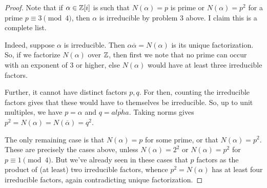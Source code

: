 \begin{proof}
    Note that if $\alpha \in \mathbb{Z}[i]$ is such that $N(\alpha) = p$ is prime or $N(\alpha) = p^2$ for a prime $p \equiv 3 \pmod{4}$, then $\alpha$ is irreducible by problem 3 above. I claim this is a complete list.

    Indeed, suppose $\alpha$ is irreducible. Then $\alpha\overline{\alpha} = N(\alpha)$ is its unique factorization. So, if we factorize $N(\alpha)$ over $\mathbb{Z}$, then first we note that no prime can occur with an exponent of $3$ or higher, else $N(\alpha)$ would have at least three irreducible factors.
    
    Further, it cannot have distinct factors $p,q$. For then, counting the irreducible factors gives that these would have to themselves be irreducible. So, up to unit multiples, we have $p = \alpha$ and $q = \overline{alpha}$. Taking norms gives $p^2 = N(\alpha) = N(\overline{\alpha}) = q^2$.
    
    The only remaining case is that $N(\alpha) = p$ for some prime, or that $N(\alpha) = p^2$. These are precisely the cases above, unless $N(\alpha) = 2^2$ or $N(\alpha) = p^2$ for $p \equiv 1 \pmod{4}$. But we've already seen in these cases that $p$ factors as the product of (at least) two irreducible factors, whence $p^2 = N(\alpha)$ has at least four irreducible factors, again contradicting unique factorization.
\end{proof}